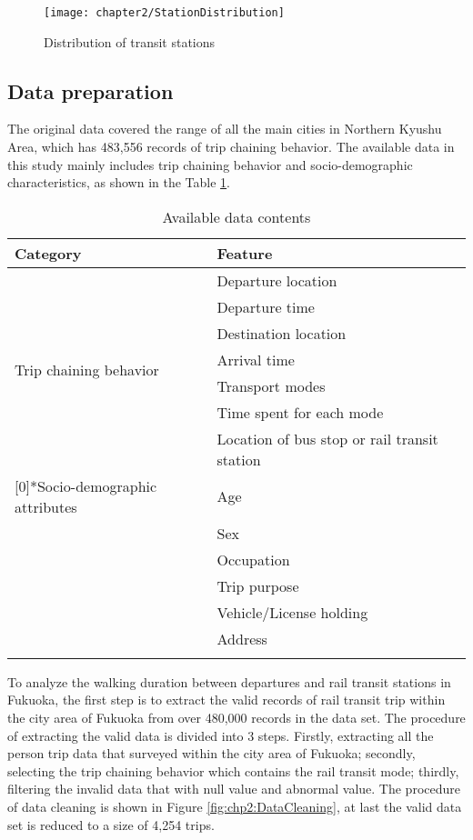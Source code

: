 \begin{figure}[htbp]
	\centering
	\texttt{[image: chapter2/StationDistribution]}
	\caption{Distribution of transit stations}
	\label{fig:chp2:StationDistribution}
\end{figure}

%
\subsection{Data preparation}
The original data covered the range of all the main cities in Northern Kyushu Area, which has 483,556 records of trip chaining behavior. The available data in this study mainly includes trip chaining behavior and socio-demographic characteristics, as shown in the Table \ref{tab:chp2:Data}.

\begin{table}[htbp]
	\centering
	\caption{Available data contents}
	\label{tab:chp2:Data}
	\small
	\renewcommand{\arraystretch}{1.25} %
	\begin{tabular}{ll}
		\Xhline{1.5pt}
		Category                      & Feature\\
		\midrule
		\multirow{7}[0]{*}{Trip chaining behavior} 
		& Departure location \\
		& Departure time \\
		& Destination location \\
		& Arrival time \\
		& Transport modes \\
		& Time spent for each mode \\
		& Location of bus stop or rail transit station \\
		\Xhline{0.5pt}
		
		\multirow{6}[0]{*}{Socio-demographic attributes}
		& Age \\
		& Sex \\
		& Occupation \\
		& Trip purpose \\
		& Vehicle/License holding \\
		& Address \\
		\Xhline{1.5pt}
	\end{tabular}
\end{table}

%
To analyze the walking duration between departures and rail transit stations in Fukuoka, the first step is to extract the valid records of rail transit trip within the city area of Fukuoka from over 480,000 records in the data set. The procedure of extracting the valid data is divided into 3 steps. Firstly, extracting all the person trip data that surveyed within the city area of Fukuoka; secondly, selecting the trip chaining behavior which contains the rail transit mode; thirdly, filtering the invalid data that with null value and abnormal value. The procedure of data cleaning is shown in Figure \ref{fig:chp2:DataCleaning}, at last the valid data set is reduced to a size of 4,254 trips.

